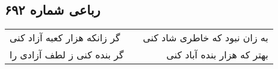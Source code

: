 \begin{center}
\section*{رباعی شماره ۶۹۲}
\label{sec:sh692}
\begin{longtable}{l p{0.5cm} r}
گر زانکه هزار کعبه آزاد کنی
&&
به زان نبود که خاطری شاد کنی
\\
گر بنده کنی ز لطف آزادی را
&&
بهتر که هزار بنده آباد کنی
\\
\end{longtable}
\end{center}
